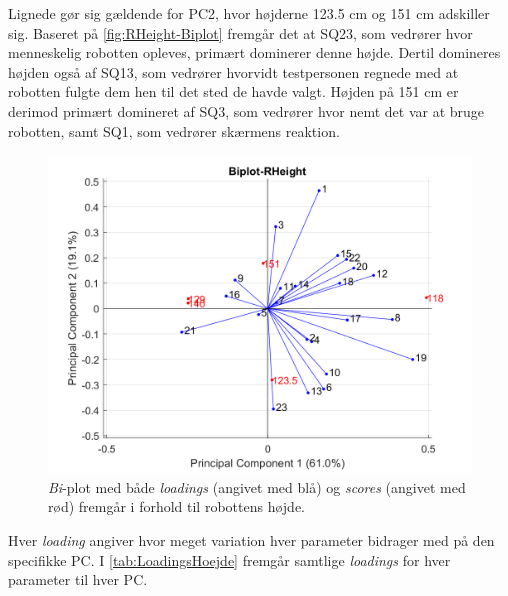 Lignede gør sig gældende for PC2, hvor højderne 123.5 cm og 151 cm adskiller sig. Baseret på \autoref{fig:RHeight-Biplot} fremgår det at SQ23, som vedrører hvor menneskelig robotten opleves, primært dominerer denne højde. Dertil domineres højden også af SQ13, som vedrører hvorvidt testpersonen regnede med at robotten fulgte dem hen til det sted de havde valgt. Højden på 151 cm er derimod primært domineret af SQ3, som vedrører hvor nemt det var at bruge robotten, samt SQ1, som vedrører skærmens reaktion. 
%
\begin{figure}[H]
\centering
\includegraphics[width=\textwidth]{Figure/DatabehandlingSkalaer/PCAfigures/RHeight-Biplot.png}
\caption{\textit{Bi}-plot med både \textit{loadings} (angivet med blå) og \textit{scores} (angivet med rød) fremgår i forhold til robottens højde.}
\label{fig:RHeight-Biplot}
\end{figure}
\noindent
%
Hver \textit{loading} angiver hvor meget variation hver parameter bidrager med på den specifikke PC. I \autoref{tab:LoadingsHoejde} fremgår samtlige \textit{loadings} for hver parameter til hver PC.
%
